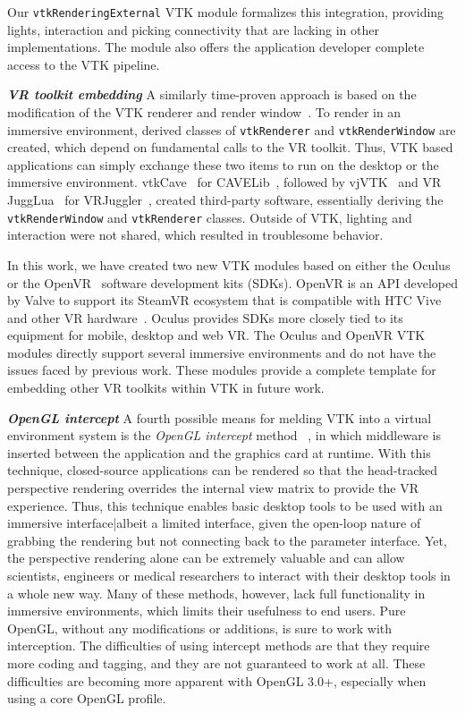 Our \texttt{vtkRenderingExternal} VTK module formalizes this integration, providing lights, interaction and picking connectivity that are lacking in other implementations. The module also offers the application developer complete access to the VTK pipeline.

\textbf{\textit{VR toolkit embedding}} A similarly time-proven approach is based on the modification of the VTK renderer and render window~\cite{van2000vista, Hannema:2001, Shamonin02vtkcave, Belleman:2003}. 
To render in an immersive environment, derived classes of
\texttt{vtkRenderer} and \texttt{vtkRenderWindow} are created, which depend on fundamental calls to the VR toolkit.
Thus, VTK based applications can simply exchange these two items to run on the desktop or the immersive environment.
vtkCave~\cite{Tufo:1999} for CAVELib~\cite{CAVELib:2016}, followed by
vjVTK~\cite{Blom:2006} and VR JuggLua~\cite{Pavlik:2012} for
VRJuggler~\cite{Bierbaum:2001}, created third-party software, essentially
deriving the \texttt{vtkRenderWindow} and \texttt{vtkRenderer} classes. Outside of VTK, lighting and interaction were not shared, which resulted in troublesome behavior.

In this work, we have created two new VTK modules based on either the Oculus~\cite{Oculus:2016} or the OpenVR~\cite{OpenVR:2016} software development kits (SDKs).
OpenVR is an API developed by Valve to support its SteamVR ecosystem that is compatible with HTC Vive and other VR hardware~\cite{Road2VR:2015}. Oculus provides SDKs more closely tied to its equipment for mobile, desktop and web VR. The Oculus and OpenVR VTK modules directly support several immersive environments
and do not have the issues faced by previous work. These modules provide a complete template
for embedding other VR toolkits within VTK in future work.

\textit{\textbf{OpenGL intercept}}
A fourth possible means for melding VTK into a virtual environment system
is the \textit{OpenGL intercept} method
~\cite{Humphreys:2001,Humphreys:2002,Zielinski:2014,TechViz:2016,Conduit:2016}, in which middleware is inserted between the application and the graphics card at runtime.
With this technique, closed-source applications can be rendered so that
the head-tracked perspective rendering overrides the internal view matrix
to provide the VR experience.
Thus, this technique enables basic desktop tools to be used with an
immersive interface|albeit a limited interface, given the open-loop nature of
grabbing the rendering but not connecting back to the parameter interface.
Yet, the perspective rendering alone can be extremely valuable and can allow
scientists, engineers or medical researchers to interact with their desktop
tools in a whole new way. Many of these methods, however, lack full functionality in immersive environments, which limits their usefulness to end users.
Pure OpenGL, without any modifications or additions, is sure to work with interception.
The difficulties of using intercept methods are that they require more coding
and tagging, and they are not guaranteed to work at all. These difficulties are becoming
more apparent with OpenGL 3.0+, especially when using a core OpenGL profile.

